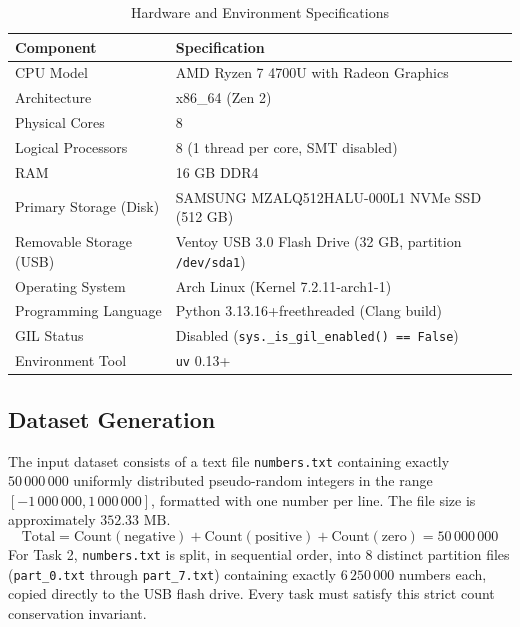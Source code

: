 \documentclass{labreport}
\begin{document}
\begin{table}[H]
\centering
\caption{Hardware and Environment Specifications}
\label{tab:hardware}
\begin{tabular}{ll}
\toprule
\textbf{Component} & \textbf{Specification} \\
\midrule
CPU Model & AMD Ryzen 7 4700U with Radeon Graphics \\
Architecture & x86\_64 (Zen 2) \\
Physical Cores & 8 \\
Logical Processors & 8 (1 thread per core, SMT disabled) \\
RAM & 16 GB DDR4 \\
Primary Storage (Disk) & SAMSUNG MZALQ512HALU-000L1 NVMe SSD (512 GB) \\
Removable Storage (USB) & Ventoy USB 3.0 Flash Drive (32 GB, partition \texttt{/dev/sda1}) \\
Operating System & Arch Linux (Kernel 7.2.11-arch1-1) \\
Programming Language & Python 3.13.16+freethreaded (Clang build) \\
GIL Status & Disabled (\texttt{sys.\_is\_gil\_enabled() == False}) \\
Environment Tool & \texttt{uv} 0.13+ \\
\bottomrule
\end{tabular}
\end{table}

\subsection{Dataset Generation}
The input dataset consists of a text file \texttt{numbers.txt} containing exactly $50\,000\,000$ uniformly distributed pseudo-random integers in the range $[-1\,000\,000, 1\,000\,000]$, formatted with one number per line. The file size is approximately $352.33\text{ MB}$.
\begin{equation}
\text{Total} = \text{Count}(\text{negative}) + \text{Count}(\text{positive}) + \text{Count}(\text{zero}) = 50\,000\,000
\end{equation}
For Task 2, \texttt{numbers.txt} is split, in sequential order, into 8 distinct partition files (\texttt{part\_0.txt} through \texttt{part\_7.txt}) containing exactly $6\,250\,000$ numbers each, copied directly to the USB flash drive. Every task must satisfy this strict count conservation invariant.

\newpage

\end{document}

